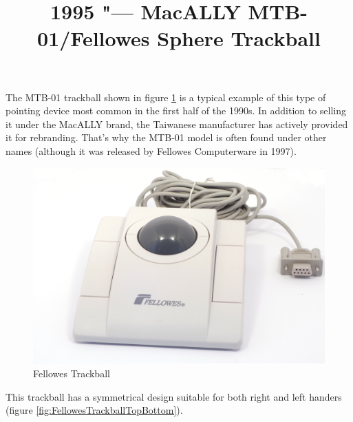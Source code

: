\documentclass[11pt, a4paper]{article}
\begin{document}
\title{1995 "--- MacALLY MTB-01/Fellowes Sphere Trackball}
\date{}
\maketitle
{}
The MTB-01 trackball shown in figure \ref{fig:FellowesTrackballPic} is a typical example of this type of pointing device most common in the first half of the 1990s. In addition to selling it under the MacALLY brand, the Taiwanese manufacturer has actively provided it for rebranding. That's why the MTB-01 model is often found under other names (although it was released by Fellowes Computerware in 1997).

\begin{figure}[h]
    \centering
    \includegraphics[scale=0.5]{1995_fellowes_trackball/pic_30.jpg}
    \caption{Fellowes Trackball}
    \label{fig:FellowesTrackballPic}
\end{figure}

This trackball has a symmetrical design suitable for both right and left handers (figure \ref{fig:FellowesTrackballTopBottom}).
\end{document}
